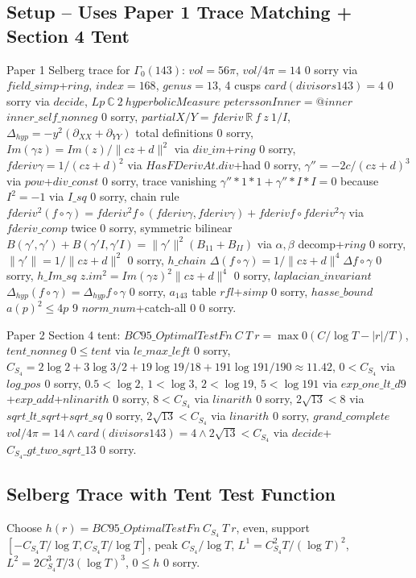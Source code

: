 \documentclass[12pt]{article}
\begin{document}
\subsection{Setup -- Uses Paper 1 Trace Matching + Section 4 Tent}
Paper 1 Selberg trace for $\Gamma_0(143)$: $vol=56\pi$, $vol/4\pi=14$ 0 sorry via $field\_simp$+$ring$, $index=168$, $genus=13$, 4 cusps $card(divisors 143)=4$ 0 sorry via $decide$, $Lp\ \mathbb{C}\ 2\ hyperbolicMeasure$ $peterssonInner=@inner$ $inner\_self\_nonneg$ 0 sorry, $partialX/Y=fderiv\ \mathbb{R}\ f\ z\ 1/I$, $\Delta_{hyp}=-y^2(\partial_{XX}+\partial_{YY})$ total definitions 0 sorry, $Im(\gamma z)=Im(z)/\|cz+d\|^2$ via $div\_im$+$ring$ 0 sorry, $fderiv\gamma=1/(cz+d)^2$ via $HasFDerivAt.div$+had 0 sorry, $\gamma''=-2c/(cz+d)^3$ via $pow$+$div\_const$ 0 sorry, trace vanishing $\gamma''*1*1+\gamma''*I*I=0$ because $I^2=-1$ via $I\_sq$ 0 sorry, chain rule $fderiv^2(f\circ\gamma)=fderiv^2f\circ(fderiv\gamma,fderiv\gamma)+fderiv f\circ fderiv^2\gamma$ via $fderiv\_comp$ twice 0 sorry, symmetric bilinear $B(\gamma',\gamma')+B(\gamma'I,\gamma'I)=\|\gamma'\|^2(B_{11}+B_{II})$ via $\alpha,\beta$ decomp+$ring$ 0 sorry, $\|\gamma'\|=1/\|cz+d\|^2$ 0 sorry, $h\_chain$ $\Delta(f\circ\gamma)=1/\|cz+d\|^4\Delta f\circ\gamma$ 0 sorry, $h\_Im\_sq$ $z.im^2=Im(\gamma z)^2\|cz+d\|^4$ 0 sorry, $laplacian\_invariant$ $\Delta_{hyp}(f\circ\gamma)=\Delta_{hyp}f\circ\gamma$ 0 sorry, $a_{143}$ table $rfl$+$simp$ 0 sorry, $hasse\_bound$ $a(p)^2\le4p$ 9 $norm\_num$+catch-all 0 0 sorry.

Paper 2 Section 4 tent: $BC95\_OptimalTestFn\ C\ T\ r=\max0(C/\log T-|r|/T)$, $tent\_nonneg$ $0\le tent$ via $le\_max\_left$ 0 sorry, $C_{S_4}=2\log2+3\log3/2+19\log19/18+191\log191/190\approx11.42$, $0<C_{S_4}$ via $log\_pos$ 0 sorry, $0.5<\log2$, $1<\log3$, $2<\log19$, $5<\log191$ via $exp\_one\_lt\_d9$+$exp\_add$+$nlinarith$ 0 sorry, $8<C_{S_4}$ via $linarith$ 0 sorry, $2\sqrt{13}<8$ via $sqrt\_lt\_sqrt$+$sqrt\_sq$ 0 sorry, $2\sqrt{13}<C_{S_4}$ via $linarith$ 0 sorry, $grand\_complete$ $vol/4\pi=14\wedge card(divisors 143)=4\wedge2\sqrt{13}<C_{S_4}$ via $decide$+$C_{S_4}\_gt\_two\_sqrt\_13$ 0 sorry.

\subsection{Selberg Trace with Tent Test Function}
Choose $h(r)=BC95\_OptimalTestFn\ C_{S_4}\ T\ r$, even, support $[-C_{S_4}T/\log T,C_{S_4}T/\log T]$, peak $C_{S_4}/\log T$, $L^1=C_{S_4}^2T/(\log T)^2$, $L^2=2C_{S_4}^3T/3(\log T)^3$, $0\le h$ 0 sorry.
\end{document}
